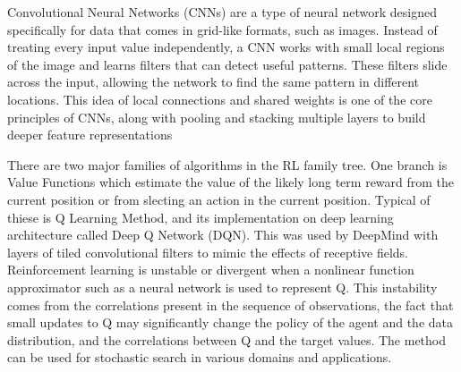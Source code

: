 

Convolutional Neural Networks (CNNs) are a type of neural network designed specifically for data that comes in grid-like formats, such as images. Instead of treating every input value independently, a CNN works with small local regions of the image and learns filters that can detect useful patterns. These filters slide across the input, allowing the network to find the same pattern in different locations. This idea of local connections and shared weights is one of the core principles of CNNs, along with pooling and stacking multiple layers to build deeper feature representations \cite{lecun:hal-04206682}

There are two major families of algorithms in the RL family tree. One branch is Value Functions which estimate the value of the likely long term reward from the current position or from slecting an action in the current position. Typical of thiese is Q Learning Method, and its implementation on deep learning architecture called Deep Q Network (DQN). This was used by DeepMind with layers of tiled convolutional filters to mimic the effects of receptive fields. Reinforcement learning is unstable or divergent when a nonlinear function approximator such as a neural network is used to represent Q. This instability comes from the correlations present in the sequence of observations, the fact that small updates to Q may significantly change the policy of the agent and the data distribution, and the correlations between Q and the target values. The method can be used for stochastic search in various domains and applications.\cite{li2023reinforcement} \cite{matzliach2022detection} \\

